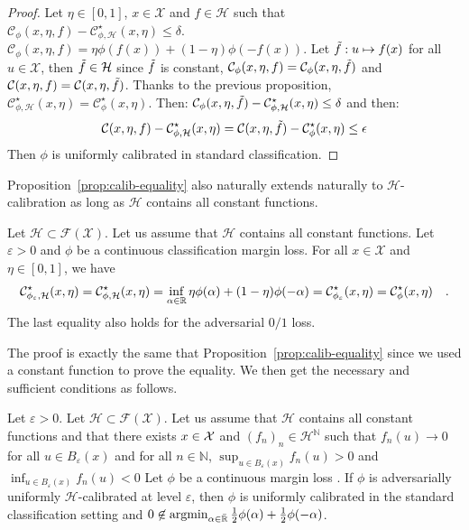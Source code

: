 \begin{proof}
Let $\eta\in[0,1]$, $x\in\mathcal{X}$ and $f\in\mathcal{H}$ such that $ \mathcal{C}_{\phi}(x,\eta,f)- \mathcal{C}^\star_{\phi,\mathcal{H}}(x,\eta)\leq\delta$.  $\mathcal{C}_{\phi}(x,\eta,f) = \eta\phi(f(x))+(1-\eta)\phi(-f(x))$. Let $\Tilde{f}:u\mapsto f(x)$ for all $u\in\mathcal{X}$, then $\Tilde{f}\in\mathcal{H}$ since $\Tilde{f}$ is constant, $\mathcal{C}_{\phi}(x,\eta,f) = \mathcal{C}_{\phi}(x,\eta,\Tilde{f})$ and $\mathcal{C}(x,\eta,f) = \mathcal{C}(x,\eta,\Tilde{f})$. Thanks to the previous proposition, $\mathcal{C}^\star_{\phi,\mathcal{H}}(x,\eta)=\mathcal{C}^\star_{\phi}(x,\eta)$. Then: $ \mathcal{C}_{\phi}(x,\eta,\Tilde{f})-\mathcal{C}^\star_{\phi,\mathcal{H}}(x,\eta)\leq \delta$ and then:
\begin{align*}
    \mathcal{C}(x,\eta,f)-\mathcal{C}^\star_{\phi,\mathcal{H}}(x,\eta) =  \mathcal{C}(x,\eta,\Tilde{f})-\mathcal{C}^\star_{\phi}(x,\eta) \leq \epsilon
\end{align*}
Then $\phi$ is uniformly calibrated in standard classification.
\end{proof}




Proposition~\ref{prop:calib-equality} also naturally extends naturally to $\mathcal{H}$-calibration as long as $\mathcal{H}$ contains all constant functions. 


\begin{prop*}
Let $\mathcal{H}\subset \mathcal{F}(\mathcal{X})$. Let us assume that $\mathcal{H}$ contains all constant functions. Let $\varepsilon>0$ and $\phi$ be a continuous classification margin loss.  For all $x\in\mathcal{X}$ and $\eta\in[0,1]$, we have
\begin{align*}
    \mathcal{C}^\star_{\phi_\varepsilon,\mathcal{H}}(x,\eta)=\mathcal{C}^\star_{\phi,\mathcal{H}}(x,\eta) =\inf_{\alpha\in\mathbb{R}}\eta \phi(\alpha)+(1-\eta)\phi(-\alpha)= \mathcal{C}^\star_{\phi_\varepsilon}(x,\eta)=\mathcal{C}^\star_{\phi}(x,\eta)\quad.
\end{align*}
The last equality also holds for the adversarial $0/1$ loss.
\end{prop*}
The proof is exactly the same that Proposition~\ref{prop:calib-equality} since we used a constant function to prove the equality. We then get the necessary and sufficient conditions as follows.



\begin{prop*} 
Let $\varepsilon>0$. Let $\mathcal{H}\subset \mathcal{F}(\mathcal{X})$. Let us assume that $\mathcal{H}$ contains all constant functions and that there exists $x\in\mathcal{X}$ and $(f_n)_n\in\mathcal{H}^\mathbb{N}$ such that $f_n(u)\to 0$ for all $ u\in B_\varepsilon(x)$ and for all $n\in\mathbb{N}$, $\sup_{u\in B_\varepsilon(x)} f_n(u)>0$ and  $\inf_{u\in B_\varepsilon(x)} f_n(u)<0$ 
Let $\phi$  be a continuous margin loss .  If $\phi$ is adversarially uniformly $\mathcal{H}$-calibrated at level $\varepsilon$, then $\phi$ is uniformly calibrated in the standard classification setting and $0\not\in \operatorname*{argmin}_{\alpha\in\bar{\mathbb{R}}}
\frac12\phi(\alpha)+\frac12\phi(-\alpha)$. 

\end{prop*}

